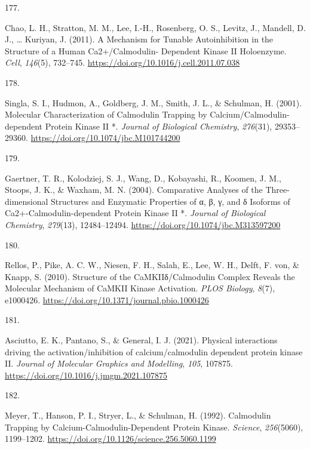 \documentclass[
  11pt,
  letterpaper,
]{scrreprt}
\newlength{\cslhangindent}
\newlength{\csllabelwidth}
\newenvironment{CSLReferences}[2] %
 {\begin{list}{}{%
  \setlength{\itemindent}{0pt}
  \setlength{\leftmargin}{0pt}
  \setlength{\parsep}{0pt}
  \ifodd #1
   \setlength{\leftmargin}{\cslhangindent}
   \setlength{\itemindent}{-1\cslhangindent}
  \fi
  \setlength{\itemsep}{#2\baselineskip}}}
 {\end{list}}
\newcommand{\CSLLeftMargin}[1]{\parbox[t]{\csllabelwidth}{\strut#1\strut}}
\newcommand{\CSLRightInline}[1]{\parbox[t]{\linewidth - \csllabelwidth}{\strut#1\strut}}
\begin{document}
\begin{CSLReferences}{0}{0}
\CSLLeftMargin{177. }%
\CSLRightInline{Chao, L. H., Stratton, M. M., Lee, I.-H., Rosenberg, O.
S., Levitz, J., Mandell, D. J., \ldots{} Kuriyan, J. (2011). A
{Mechanism} for {Tunable Autoinhibition} in the {Structure} of a {Human
Ca2}+/{Calmodulin- Dependent Kinase II Holoenzyme}. \emph{Cell},
\emph{146}(5), 732--745.
\url{https://doi.org/10.1016/j.cell.2011.07.038}}

\CSLLeftMargin{178. }%
\CSLRightInline{Singla, S. I., Hudmon, A., Goldberg, J. M., Smith, J.
L., \& Schulman, H. (2001). Molecular {Characterization} of {Calmodulin
Trapping} by {Calcium}/{Calmodulin-dependent Protein Kinase II} *.
\emph{Journal of Biological Chemistry}, \emph{276}(31), 29353--29360.
\url{https://doi.org/10.1074/jbc.M101744200}}

\CSLLeftMargin{179. }%
\CSLRightInline{Gaertner, T. R., Kolodziej, S. J., Wang, D., Kobayashi,
R., Koomen, J. M., Stoops, J. K., \& Waxham, M. N. (2004). Comparative
{Analyses} of the {Three-dimensional Structures} and {Enzymatic
Properties} of α, β, γ, and δ {Isoforms} of {Ca2}+-{Calmodulin-dependent
Protein Kinase II} *. \emph{Journal of Biological Chemistry},
\emph{279}(13), 12484--12494.
\url{https://doi.org/10.1074/jbc.M313597200}}

\CSLLeftMargin{180. }%
\CSLRightInline{Rellos, P., Pike, A. C. W., Niesen, F. H., Salah, E.,
Lee, W. H., Delft, F. von, \& Knapp, S. (2010). Structure of the
{CaMKIIδ}/{Calmodulin Complex Reveals} the {Molecular Mechanism} of
{CaMKII Kinase Activation}. \emph{PLOS Biology}, \emph{8}(7), e1000426.
\url{https://doi.org/10.1371/journal.pbio.1000426}}

\CSLLeftMargin{181. }%
\CSLRightInline{Asciutto, E. K., Pantano, S., \& General, I. J. (2021).
Physical interactions driving the activation/inhibition of
calcium/calmodulin dependent protein kinase {II}. \emph{Journal of
Molecular Graphics and Modelling}, \emph{105}, 107875.
\url{https://doi.org/10.1016/j.jmgm.2021.107875}}

\CSLLeftMargin{182. }%
\CSLRightInline{Meyer, T., Hanson, P. I., Stryer, L., \& Schulman, H.
(1992). Calmodulin {Trapping} by {Calcium-Calmodulin-Dependent Protein
Kinase}. \emph{Science}, \emph{256}(5060), 1199--1202.
\url{https://doi.org/10.1126/science.256.5060.1199}}


\end{CSLReferences}
\end{document}
